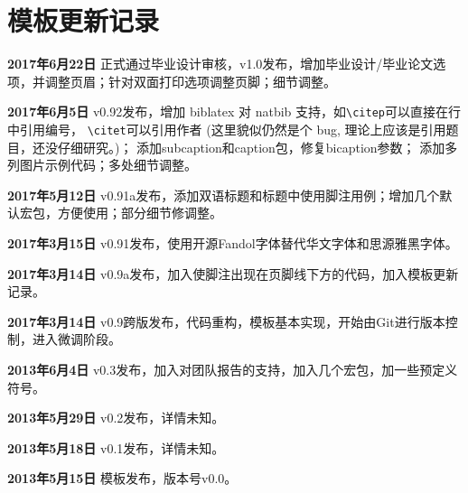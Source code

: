 \chapter{模板更新记录}
\label{chap:updatelog}
\textbf{2017年6月22日} \nuaathesis 正式通过毕业设计审核，v1.0发布，增加毕业设计/毕业论文选项，并调整页眉；针对双面打印选项调整页脚；细节调整。

\textbf{2017年6月5日} v0.92发布，增加 biblatex 对 natbib 支持，如\verb!\citep!可以直接在行中引用编号， \verb!\citet!可以引用作者 (这里貌似仍然是个 bug, 理论上应该是引用题目，还没仔细研究。)； 添加subcaption和caption包，修复bicaption参数； 添加多列图片示例代码；多处细节调整。

\textbf{2017年5月12日} v0.91a发布，添加双语标题和标题中使用脚注用例；增加几个默认宏包，方便使用；部分细节修调整。

\textbf{2017年3月15日} v0.91发布，使用开源Fandol字体替代华文字体和思源雅黑字体。

\textbf{2017年3月14日} v0.9a发布，加入使脚注出现在页脚线下方的代码，加入模板更新记录。

\textbf{2017年3月14日} v0.9跨版发布，代码重构，模板基本实现，开始由Git进行版本控制，进入微调阶段。

\textbf{2013年6月4日} v0.3发布，加入对团队报告的支持，加入几个宏包，加一些预定义符号。

\textbf{2013年5月29日} v0.2发布，详情未知。

\textbf{2013年5月18日} v0.1发布，详情未知。

\textbf{2013年5月15日} 模板发布，版本号v0.0。
